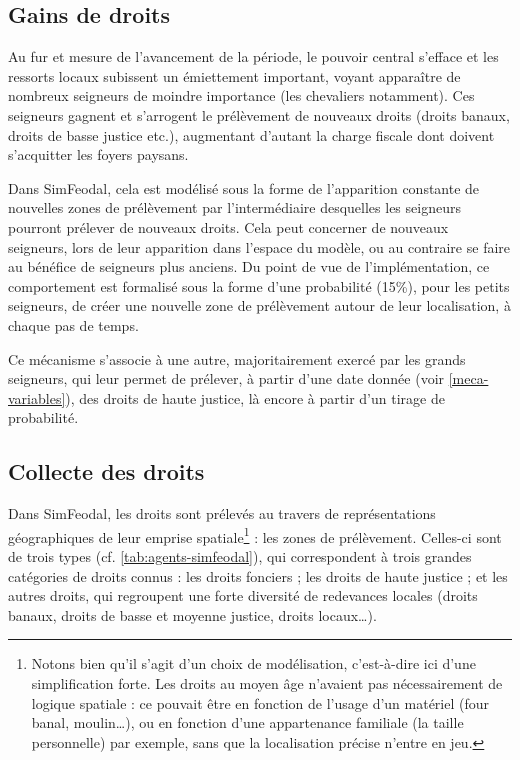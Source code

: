 \subsection{Gains de droits}

Au fur et mesure de l'avancement de la période, le pouvoir central s'efface et les ressorts locaux subissent un émiettement important, voyant apparaître de nombreux seigneurs de moindre importance (les chevaliers notamment).
Ces seigneurs gagnent et s'arrogent le prélèvement de nouveaux droits (droits banaux, droits de basse justice etc.), augmentant d'autant la charge fiscale dont doivent s'acquitter les foyers paysans.

Dans SimFeodal, cela est modélisé sous la forme de l'apparition constante de nouvelles zones de prélèvement par l'intermédiaire desquelles les seigneurs pourront prélever de nouveaux droits.
Cela peut concerner de nouveaux seigneurs, lors de leur apparition dans l'espace du modèle, ou au contraire se faire au bénéfice de seigneurs plus anciens.
Du point de vue de l'implémentation, ce comportement est formalisé sous la forme d'une probabilité (15\%), pour les petits seigneurs, de créer une nouvelle zone de prélèvement autour de leur localisation, à chaque pas de temps.

Ce mécanisme s'associe à une autre, majoritairement exercé par les grands seigneurs, qui leur permet de prélever, à partir d'une date donnée (voir \cref{meca-variables}), des droits de haute justice, là encore à partir d'un tirage de probabilité.

\subsection{Collecte des droits}

Dans SimFeodal, les droits sont prélevés au travers de représentations géographiques de leur emprise spatiale\footnote{
Notons bien qu'il s'agit d'un choix de modélisation, c'est-à-dire ici d'une simplification forte.
Les droits au moyen âge n'avaient pas nécessairement de logique spatiale : ce pouvait être en fonction de l'usage d'un matériel (four banal, moulin\ldots), ou en fonction d'une appartenance familiale (la \og taille\fg{} personnelle) par exemple, sans que la localisation précise n'entre en jeu.
} : les zones de prélèvement.
Celles-ci sont de trois types (cf. \cref{tab:agents-simfeodal}), qui correspondent à trois grandes catégories de droits connus : les droits fonciers ; les droits de haute justice ; et les autres droits, qui regroupent une forte diversité de redevances locales (droits banaux, droits de basse et moyenne justice, droits locaux\ldots).

